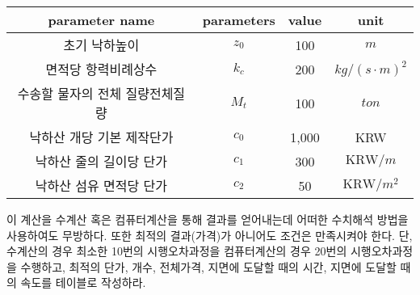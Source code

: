 \documentclass[a4,10pt]{article}
\theoremstyle{examplestyle}
\let\\\tabularnewline
\let\\\tabularnewline
\begin{document}
\begin{table}[!hbt]
\centering
\begin{tabular}{c|c|c|c}
\hline\hline
parameter name&parameters&value&unit\\
\hline
초기 낙하높이&$z_{0}$&100&$m$\\
면적당 항력비례상수&$k_{c}$&200&$kg/(s\cdot m)^2$\\
수송할 물자의 전체 질량전체질량&$M_{t}$&100&$ton$\\
낙하산 개당 기본 제작단가&$c_{0}$&1,000&KRW\\
낙하산 줄의 길이당 단가&$c_{1}$&300&$\text{KRW}/m$\\
낙하산 섬유 면적당 단가&$c_{2}$&50&$\text{KRW}/m^2$\\
\hline\hline
\end{tabular}
\end{table}
이 계산을 수계산 혹은 컴퓨터계산을 통해 결과를 얻어내는데 어떠한 수치해석 방법을 사용하여도 무방하다. 또한 최적의 결과(가격)가 아니어도 조건은 만족시켜야 한다.
단, 수계산의 경우 최소한 10번의 시행오차과정을 컴퓨터계산의 경우 20번의 시행오차과정을 수행하고, 최적의 단가, 개수, 전체가격, 지면에 도달할 때의 시간, 지면에 도달할 때의 속도를 테이블로 작성하라.
\end{document}
